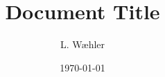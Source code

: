 \documentclass[12pt, letterpaper]{article}
\title{Document Title}
\author{L. Wæhler}
\date{\today}
\begin{document}
\begin{titlepage}
    \maketitle
    \tableofcontents
    \thispagestyle{empty}
\end{titlepage}
\end{document}
